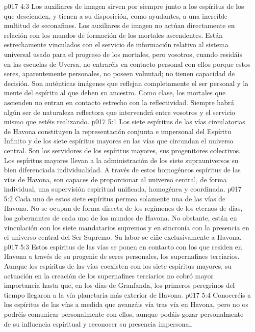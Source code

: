 \vs p017 4:3 Los auxiliares de imagen sirven por siempre junto a los espíritus de los que descienden, y tienen a su disposición, como ayudantes, a una increíble multitud de seconafines. Los auxiliares de imagen no actúan directamente en relación con los mundos de formación de los mortales ascendentes. Están estrechamente vinculados con el servicio de información relativo al sistema universal usado para el progreso de los mortales, pero vosotros, cuando residáis en las escuelas de Uversa, no entraréis en contacto personal con ellos porque estos seres, aparentemente personales, no poseen voluntad; no tienen capacidad de decisión. Son auténticas imágenes que reflejan completamente el ser personal y la mente del espíritu al que deben su ancestro. Como clase, los mortales que ascienden no entran en contacto estrecho con la reflectividad. Siempre habrá algún ser de naturaleza reflectora que intervendrá entre vosotros y el servicio mismo que estéis realizando.
\vs p017 5:1 Los siete espíritus de las vías circulatorias de Havona constituyen la representación conjunta e impersonal del Espíritu Infinito y de los siete espíritus mayores en las vías que circundan el universo central. Son los servidores de los espíritus mayores, sus progenitores colectivos. Los espíritus mayores llevan a la administración de los siete suprauniversos su bien diferenciada individualidad. A través de estos homogéneos espíritus de las vías de Havona, son capaces de proporcionar al universo central, de forma individual, una supervisión espiritual unificada, homogénea y coordinada.
\vs p017 5:2 Cada uno de estos siete espíritus permea solamente una de las vías de Havona. No se ocupan de forma directa de los regímenes de los eternos de días, los gobernantes de cada uno de los mundos de Havona. No obstante, están en vinculación con los siete mandatarios supremos y en sincronía con la presencia en el universo central del Ser Supremo. Su labor se ciñe exclusivamente a Havona.
\vs p017 5:3 Estos espíritus de las vías se ponen en contacto con los que residen en Havona a través de su progenie de seres personales, los supernafines terciarios. Aunque los espíritus de las vías coexisten con los siete espíritus mayores, su actuación en la creación de los supernafines terciarios no cobró mayor importancia hasta que, en los días de Granfanda, los primeros peregrinos del tiempo llegaron a la vía planetaria más exterior de Havona.
\vs p017 5:4 Conoceréis a los espíritus de las vías a medida que avanzáis vía tras vía en Havona, pero no os podréis comunicar personalmente con ellos, aunque podáis gozar personalmente de su influencia espiritual y reconocer su presencia impersonal.
